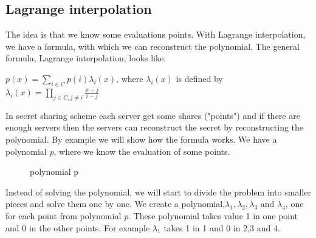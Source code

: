\subsection{Lagrange interpolation}
The idea is that we know some evaluations points. With Lagrange interpolation, we have a formula, with which we can reconstruct the polynomial.
The general formula, Lagrange interpolation, looks like:

\begin{defi}
\begin{math}p(x)=\sum\limits_{i \in C} p(i)\lambda_i(x)\end{math}, where $\lambda_i(x)$ is defined by \begin{math} \lambda_i(x)=\prod\limits_{j\in C,j\neq i}  \frac{x-j}{i-j} \end{math}
\end{defi}

\noindent
In secret sharing scheme each server get some shares ("points") and if there are enough servers then the servers can reconstruct the secret by reconstructing the polynomial. By example we will show how the formula works.  We have a polynomial \textit{p}, where we know the evaluation of some points.

\begin{figure}[H]
    \centering
    \caption{polynomial p}
\end{figure}

\noindent
Instead of solving the polynomial, we will start to divide the problem into smaller pieces and solve them one by one. We create a polynomial,\begin{math} \lambda_1, \lambda_2, \lambda_3\end{math} and \begin{math}\lambda_4\end{math}, one for each point from polynomial \textit{p}. These polynomial takes value 1 in one point and 0 in the other points. For example \begin{math} \lambda_1\end{math} takes 1 in 1 and 0 in 2,3 and 4.

